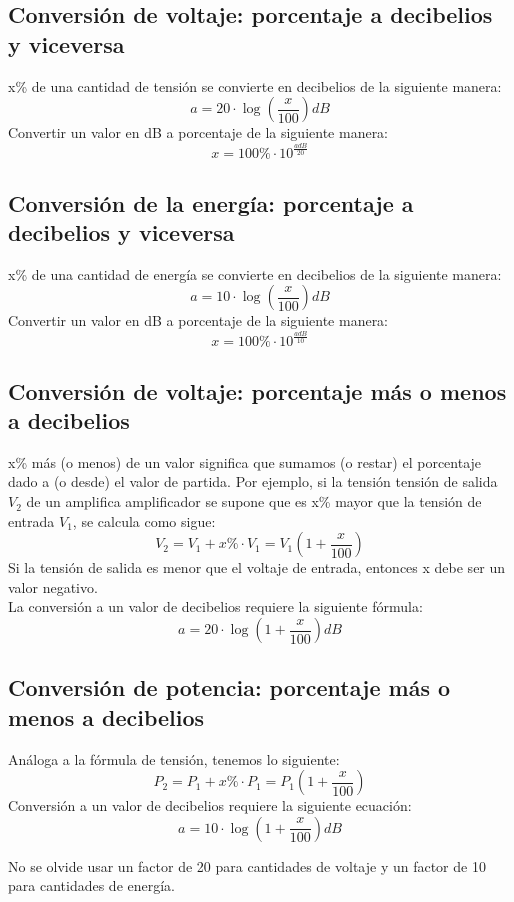 \documentclass[
	12pt, %
	fleqn, %
	a4paper, %
]{LegrandOrangeBook}
\begin{document}
\subsection{Conversión de voltaje: porcentaje a decibelios y viceversa}
x\% de una cantidad de tensión se convierte en decibelios de la siguiente manera:
\begin{equation}
a=20\cdot\log\left(\frac{x}{100}\right)dB
\end{equation}
Convertir un valor en dB a porcentaje de la siguiente manera:
\begin{equation}
x=100\%\cdot 10^{\frac{a dB}{20}}
\end{equation}
\subsection{Conversión de la energía: porcentaje a decibelios y viceversa}
x\% de una cantidad de energía se convierte en decibelios de la siguiente manera:
\begin{equation}
a=10\cdot\log\left(\frac{x}{100}\right)dB
\end{equation}
Convertir un valor en dB a porcentaje de la siguiente manera:
\begin{equation}
x=100\%\cdot 10^{\frac{a dB}{10}}
\end{equation}
\subsection{Conversión de voltaje: porcentaje más o menos a decibelios}
x\% más (o menos) de un valor significa que sumamos (o restar) el porcentaje dado a (o desde) el valor de partida. Por ejemplo, si la tensión tensión de salida $V_2$ de un amplifica amplificador se supone que es x\% mayor que la
tensión de entrada $V_1$, se calcula como sigue:
\begin{equation}
V_2=V_1 + x\%\cdot V_1= V_1\left(1+\frac{x}{100}\right)
\end{equation}
Si la tensión de salida es menor que el voltaje de entrada, entonces x debe ser un valor negativo.\\
La conversión a un valor de decibelios requiere la siguiente fórmula:
\begin{equation}
a=20\cdot\log\left(1+\frac{x}{100}\right)dB
\end{equation}
\subsection{Conversión de potencia: porcentaje más o menos a decibelios}
Análoga a la fórmula de tensión, tenemos lo siguiente:
\begin{equation}
P_2=P_1+x\%\cdot P_1= P_1\left(1+\frac{x}{100}\right)
\end{equation}
Conversión a un valor de decibelios requiere la siguiente ecuación:
\begin{equation}
a=10\cdot\log\left(1+\frac{x}{100}\right)dB
\end{equation}
\begin{remark}
No se olvide usar un factor de 20 para cantidades de voltaje y un factor de 10 para cantidades de energía.
\end{remark}
\end{document}
